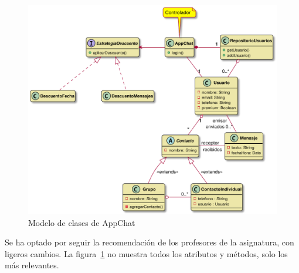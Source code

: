 \documentclass[11pt]{article}
\begin{document}
\begin{figure}[H]
	\centering
	\includegraphics[width=0.7\linewidth]{figures/modelo}
	\caption{Modelo de clases de AppChat}
	\label{fig:modelo}
\end{figure}

Se ha optado por seguir la recomendación de los profesores de la asignatura, con ligeros cambios. La figura~\ref{fig:modelo} no muestra todos los atributos y métodos, solo los más relevantes.
\end{document}
